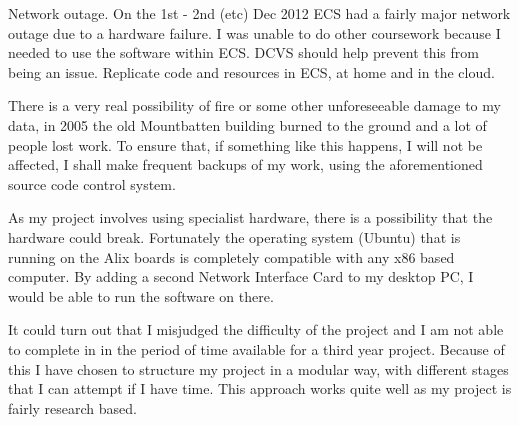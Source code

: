 \documentclass[12pt]{report}
\begin{document}
Network outage. On the 1st - 2nd (etc) Dec 2012 ECS had a fairly major network
outage due to a hardware failure. I was unable to do other coursework because I
needed to use the software within ECS. DCVS should help prevent this from being
an issue. Replicate code and resources in ECS, at home and in the cloud. 

There is a very real possibility of fire or some other unforeseeable damage to my
data, in 2005 the old Mountbatten building burned to the ground and a lot of
people lost work. To ensure that, if something like this happens, I will not be
affected, I shall make frequent backups of my work, using the aforementioned
source code control system.

As my project involves using specialist hardware, there is a possibility that
the hardware could break. Fortunately the operating system (Ubuntu) that is running on
the Alix boards is completely compatible with any x86 based computer. By adding
a second Network Interface Card to my desktop PC, I would be able to run the
software on there. 

It could turn out that I misjudged the difficulty of the project and I am not
able to complete in in the period of time available for a third year project.
Because of this I have chosen to structure my project in a modular way, with
different stages that I can attempt if I have time. This approach works quite
well as my project is fairly research based. 
\end{document}
